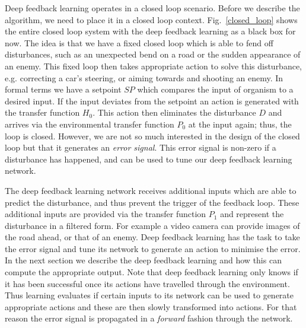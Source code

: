 \documentclass{llncs}
\begin{document}
Deep feedback learning operates in a closed loop scenario. Before we
describe the algorithm, we need to place it in a closed loop
context. Fig.~\ref{closed_loop} shows the entire closed loop system
with the deep feedback learning as a black box for now. The idea
is that we have a fixed closed loop which is able to fend off
disturbances, such as an unexpected bend on a road or the sudden
appearance of an enemy. This fixed loop then takes appropriate action
to solve this disturbance, e.g. correcting a car's steering, or
aiming towards and shooting an enemy. In formal terms we have a
setpoint $SP$ which compares the input of organism to a desired
input. If the input deviates from the setpoint an action is generated
with the transfer function $H_0$. This action then eliminates the
disturbance $D$ and arrives via the environmental transfer function
$P_0$ at the input again; thus, the loop is closed. However, we are
not so much interested in the design of the closed loop
but that it generates an \textsl{error signal}. This error signal is
non-zero if a disturbance has happened, and can be
used to tune our deep feedback learning network.

The deep feedback learning network receives additional inputs which are able
to predict the disturbance, and thus prevent the trigger of the feedback
loop. These additional inputs are provided via the transfer function $P_1$
and represent the disturbance in a filtered form. For example a video camera
can provide images of the road ahead, or that of an enemy. Deep feedback
learning has the task to take the error signal and tune its network
to generate an action to minimise the error. In the next section
we describe the deep feedback learning and how this can
compute the appropriate output. Note that deep feedback learning only knows if it has been
successful once its actions have travelled through the environment. Thus learning
evaluates if certain inputs to its network can be used to generate
appropriate actions and these are then slowly transformed into actions.
For that reason the error signal is propagated in a \textsl{forward} fashion
through the network.
\end{document}
